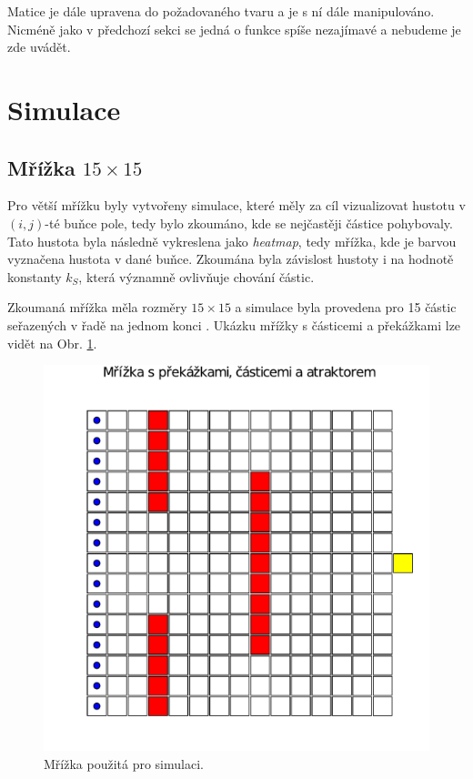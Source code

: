 \documentclass[a4paper, 12pt, fleqn]{article}
\begin{document}
	Matice je dále upravena do požadovaného tvaru a je s ní dále manipulováno. Nicméně jako v předchozí sekci se jedná o funkce spíše nezajímavé a nebudeme je zde uvádět.
	
	\newpage
	\section{Simulace}
	
	\subsection{Mřížka $15 \times 15$}
	
	Pro větší mřížku byly vytvořeny simulace, které měly za cíl vizualizovat hustotu v $(i,j)$-té buňce pole, tedy bylo zkoumáno, kde se nejčastěji částice pohybovaly. Tato hustota byla následně vykreslena jako \textit{heatmap}, tedy mřížka, kde je barvou vyznačena hustota v dané buňce. Zkoumána byla závislost hustoty i na hodnotě konstanty $k_S$, která významně ovlivňuje chování částic.
	
	Zkoumaná mřížka měla rozměry $15 \times 15$ a simulace byla provedena pro 15 částic seřazených v řadě na jednom konci . Ukázku mřížky s částicemi a překážkami lze vidět na Obr. \ref{Obr: Místnost}.
	
	\begin{figure}[h]
		\centering
		\includegraphics[trim={0 1cm 0 1cm},clip,width=0.8\linewidth]{images/mrizka.pdf}
		\caption{Mřížka použitá pro simulaci.}
		\label{Obr: Místnost}
	\end{figure}
	
\end{document}

